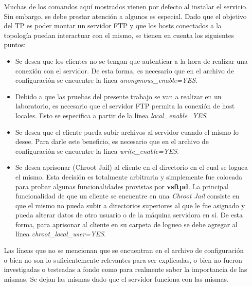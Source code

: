 		Muchas de los comandos aquí mostrados vienen por defecto al instalar el servicio. Sin embargo, se debe prestar atención a algunos es especial.
		Dado que el objetivo del TP es poder montar un servidor FTP y que los hosts conectados a la topología puedan interactuar con el mismo, se tienen
		en cuenta los siguientes puntos:
		\begin{itemize}
			\item Se desea que los clientes no se tengan que autenticar a la hora de realizar una conexión con el servidor. De esta forma, es necesario que
			en el archivo de configuración se encuentre la línea \textit{anonymous\_enable=YES}.
			\item Debido a que las pruebas del presente trabajo se van a realizar en un laboratorio, es necesario que el servidor FTP permita la conexión
			de host locales. Esto se especifica a partir de la línea \textit{local\_enable=YES}.
			\item Se desea que el cliente pueda subir archivos al servidor cuando el mismo lo desee. Para darle este beneficio, es necesario que en el 
			archivo de configuración se encuentre la línea \textit{write\_enable=YES}. 
			\item Se desea aprisonar (Chroot Jail) al cliente en el directorio en el cual se loguea el mismo. Esta decisión es totalmente arbitraria y simplemente
			fue colocada para probar algunas funcionalidades provistas por \textbf{vsftpd}. La principal funcionalidad de que un cliente se encuentre en una 
			\textit{Chroot Jail} consiste en que el mismo no pueda subir a directorios superiores al que le fue asignado y pueda alterar datos de otro usuario o de
			la máquina servidora en sí. De esta forma, para aprisonar al cliente en su carpeta de logueo se debe agregar al línea \textit{chroot\_local\_user=YES}.
		\end{itemize}

		Las líneas que no se mencionan que se encuentran en el archivo de configuración o bien no son lo suficientemente relevantes para ser explicadas, o bien
		no fueron investigadas o testeadas a fondo como para realmente saber la importancia de las mismas. Se dejan las mismas dado que el servidor funciona
		con las mismas. 

